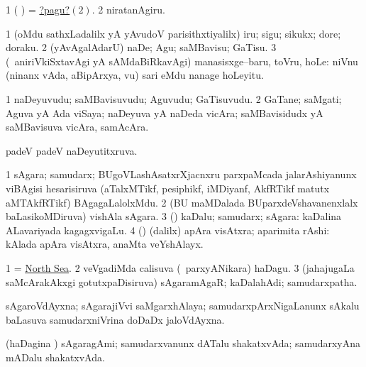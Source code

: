 \noindent
\gl{\pagu}
\bmng
\bnum
\num{1}  ( ) = \hyperlink{occupiedpagu2}{?pagu?\((2)\)}. 
\hypertarget{occupiedpagu2}{} 
\num{2}  niratanAgiru. 
\enum
\emng
\eentry

\bentry
{}
\gl{\akirx}
\bmng
\bnum
\num{1} (oMdu sathxLadalilx yA yAvudoV parisithxtiyalilx) iru; sigu; sikukx; dore; doraku. 
\num{2} (yAvAgalAdarU) naDe; Agu; saMBavisu; GaTisu. 
\num{3} (\kanmu\ aniriVkiSxtavAgi yA sAMdaBiRkavAgi) manasisxge--baru, toVru, hoLe:  niVnu (ninanx vAda, aBipArxya, \mo vu) sari eMdu nanage hoLeyitu. 
\enum
\emng
\eentry

\bentry
{}
\gl{\nA}
\bmng
\bnum
\num{1} naDeyuvudu; saMBavisuvudu; Aguvudu; GaTisuvudu. 
\num{2} GaTane; saMgati; Aguva yA Ada viSaya; naDeyuva yA naDeda vicAra; saMBavisidudx yA saMBavisuva vicAra, samAcAra. 
\enum
\emng

\noindent
\gl{\pagu}
\bmng
{} padeV padeV naDeyutitxruva. 
\emng
\eentry

\bentry
{}
\gl{\nA}
\bmng
\bnum
\num{1} sAgara; samudarx; BUgoVLashAsatxrXjacnxru parxpaMcada jalarAshiyanunx viBAgisi hesarisiruva (aTalxMTikf, pesiphikf, iMDiyanf, AkfRTikf matutx aMTAkfRTikf) BAgagaLalolxMdu. 
\num{2} (BU maMDalada BUparxdeVshavanenxlalx baLasikoMDiruva) vishAla sAgara. 
\num{3} (\kAparx) kaDalu; samudarx; sAgara:  kaDalina ALavariyada kagagxvigaLu. 
\num{4} (\rUpa) (\bava dalilx) apAra visAtxra; aparimita rAshi:  kAlada apAra visAtxra, anaMta veYshAlayx. 
\enum
\emng

\noindent
\gl{\pagu}
\bmng
\bnum
\num{1}  = \hyperref{kandict_n.pdf}{N}{North Sea}{North Sea}. 
\num{2}  veVgadiMda calisuva (\kanmu\ parxyANikara) haDagu. 
\num{3}  (ja{ha}jugaLa saMcArakAkxgi gotutxpaDisiruva) sAgaramAgaR; kaDalahAdi; samudarxpatha. 
\enum
\emng
\eentry

\bentry
{}
\gl{\nA}
\bmng
sAgaroVdAyxna; sAgarajiVvi saMgarxhAlaya; samudarxpArxNigaLanunx sAkalu baLasuva samudarxniVrina doDaDx jaloVdAyxna. 
\emng
\eentry

\bentry
{}
\gl{\gu}
\bmng
(haDagina \vi) sAgaragAmi; samudarxvanunx dATalu shakatxvAda; samudarxyAna mADalu shakatxvAda. 
\emng
\eentry

